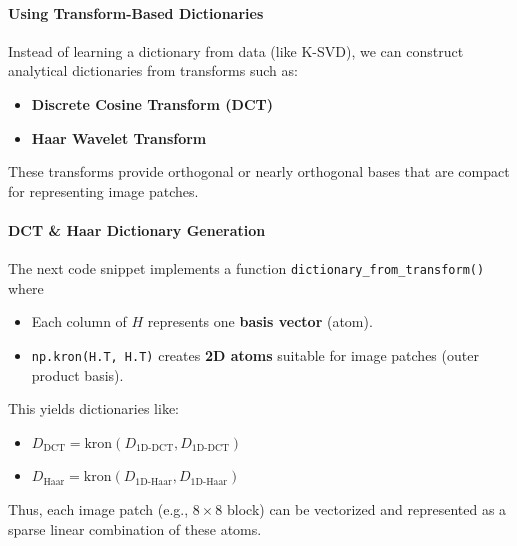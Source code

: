 \documentclass[11pt]{article}
\providecommand{\tightlist}{%
      \setlength{\itemsep}{0pt}\setlength{\parskip}{0pt}}
\begin{document}
\hypertarget{using-transform-based-dictionaries}{%
\paragraph{\texorpdfstring{\textbf{Using Transform-Based
Dictionaries}}{Using Transform-Based Dictionaries}}\label{using-transform-based-dictionaries}}

Instead of learning a dictionary from data (like K-SVD), we can
construct analytical dictionaries from transforms such as:

\begin{itemize}
\tightlist
\item
  \textbf{Discrete Cosine Transform (DCT)}
\item
  \textbf{Haar Wavelet Transform}
\end{itemize}

These transforms provide orthogonal or nearly orthogonal bases that are
compact for representing image patches.

\hypertarget{dct-haar-dictionary-generation}{%
\paragraph{\texorpdfstring{\textbf{DCT \& Haar Dictionary
Generation}}{DCT \& Haar Dictionary Generation}}\label{dct-haar-dictionary-generation}}

The next code snippet implements a function
\texttt{dictionary\_from\_transform()} where

\begin{itemize}
\tightlist
\item
  Each column of \(H\) represents one \textbf{basis vector} (atom).
\item
  \texttt{np.kron(H.T,\ H.T)} creates \textbf{2D atoms} suitable for
  image patches (outer product basis).
\end{itemize}

This yields dictionaries like:

\begin{itemize}
\tightlist
\item
  \(D_{\text{DCT}} = \text{kron}(D_{\text{1D-DCT}}, D_{\text{1D-DCT}})\)
\item
  \(D_{\text{Haar}} = \text{kron}(D_{\text{1D-Haar}}, D_{\text{1D-Haar}})\)
\end{itemize}

Thus, each image patch (e.g., \(8\times 8\) block) can be vectorized and
represented as a sparse linear combination of these atoms.
\end{document}
